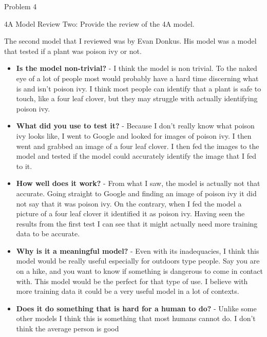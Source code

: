 \begin{problem}{Problem 4}
    \clearpage
    \begin{statement}{4A Model Review Two:}
        Provide the review of the 4A model.
    \end{statement}

    \begin{Highlight}[Solution]
        \begin{spacing}{1.50}
            The second model that I reviewed was by Evan Donkus. His model was a model that tested if a plant was poison ivy or not.

            \begin{itemize}
                \item \textbf{Is the model non-trivial?} - I think the model is non trivial. To the naked eye of a lot of people most would probably have a hard time discerning what is and isn't poison
                ivy. I think most people can identify that a plant is safe to touch, like a four leaf clover, but they may struggle with actually identifying poison ivy.
                \item \textbf{What did you use to test it?} - Because I don't really know what poison ivy looks like, I went to Google and looked for images of poison ivy. I then went and grabbed an image
                of a four leaf clover. I then fed the images to the model and tested if the model could accurately identify the image that I fed to it.
                \item \textbf{How well does it work?} - From what I saw, the model is actually not that accurate. Going straight to Google and finding an image of poison ivy it did not say that it was 
                poison ivy. On the contrary, when I fed the model a picture of a four leaf clover it identified it as poison ivy. Having seen the results from the first test I can see that it might actually
                need more training data to be accurate.
                \item \textbf{Why is it a meaningful model?} - Even with its inadequacies, I think this model would be really useful especially for outdoors type people. Say you are on a hike, and you want to
                know if something is dangerous to come in contact with. This model would be the perfect for that type of use. I believe with more training data it could be a very useful model in a lot of
                contexts.
                \item \textbf{Does it do something that is hard for a human to do?} - Unlike some other models I think this is something that most humans cannot do. I don't think the average person is good

\end{itemize}
\end{spacing}
\end{Highlight}
\end{problem}
